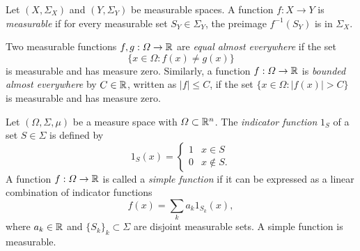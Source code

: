 \begin{definition}
    Let $(X,\Sigma_X)$ and $(Y, \Sigma_Y)$ be measurable spaces. A function $f:X\to Y$ is \emph{measurable} if for every measurable set $S_Y\in\Sigma_Y$, the preimage $f^{-1}(S_Y)$ is in $\Sigma_X$. 
    
    Two measurable functions $f,g:\Omega\to\mathbb{R}$ are \emph{equal almost everywhere} if the set 
    \begin{equation*}
        \{x\in \Omega: f(x)\neq g(x)\}
    \end{equation*}
    is measurable and has measure zero. Similarly, a function $f:\Omega\to \mathbb{R}$ is \emph{bounded almost everywhere} by $C\in\mathbb{R}$, written as $|f|\leq C$, if the set $\{x\in\Omega: |f(x)|>C\}$ is measurable and has measure zero.
\end{definition}
\begin{definition}
    Let $(\Omega,\Sigma,\mu)$ be a measure space with $\Omega\subset\mathbb{R}^n$. The \emph{indicator function} $1_S$ of a set $S\in\Sigma$ is defined by 
    \begin{equation*}
        1_S(x) = \begin{cases}
            1 & x\in S\\
            0 & x\notin S.
        \end{cases}
    \end{equation*}
    A function $f:\Omega\to \mathbb{R}$ is called a \emph{simple function} if it can be expressed as a linear combination of indicator functions 
    \begin{equation*}
        f(x) = \sum_k a_k 1_{S_k}(x),
    \end{equation*}
    where $a_k\in\mathbb{R}$ and $\{S_k\}_k\subset \Sigma$ are disjoint measurable sets. A simple function is measurable. 
\end{definition}
